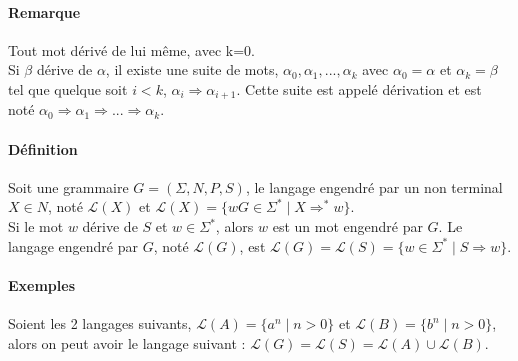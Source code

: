 

\paragraph{Remarque} %
\label{par:remarque}

Tout mot dérivé de lui même, avec k=0.\\
Si $\beta$ dérive de $\alpha$, il existe une suite de mots, $\alpha_0, \alpha_1, ... , \alpha_k$ avec $\alpha_0 = \alpha$ et $\alpha_k = \beta$ tel que quelque soit $i < k$, $\alpha_i \Rightarrow \alpha_{i+1}$. Cette suite est appelé dérivation et est noté $\alpha_0 \Rightarrow \alpha_1 \Rightarrow ... \Rightarrow \alpha_k$.



\paragraph{Définition} %
\label{par:d_finition}

Soit une grammaire $G=(\Sigma,N,P,S)$, le langage engendré par un non terminal $X \in N$, noté $\mathcal{L}(X)$ et $\mathcal{L}(X)=\{wG \in \Sigma^* \mid X \Rightarrow^* w \}$.\\
Si le mot $w$ dérive de $S$ et $w \in \Sigma^*$, alors $w$ est un mot engendré par $G$. Le langage engendré par $G$, noté $\mathcal{L}(G)$, est $\mathcal{L}(G)=\mathcal{L}(S)=\{w \in \Sigma^* \mid S \Rightarrow w\}.$



\paragraph{Exemples} %
\label{par:exemples}

Soient les 2 langages suivants, $\mathcal{L}(A)=\{a^n \mid n > 0\}$ et $\mathcal{L}(B)=\{b^n \mid n > 0\}$, alors on peut avoir le langage suivant : $\mathcal{L}(G) = \mathcal{L}(S) = \mathcal{L}(A) \cup \mathcal{L}(B)$.





